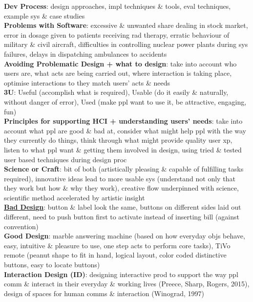 \documentclass[a4paper]{article}
\begin{document}
\begin{multicols}{3}
        \textbf{Dev Process}: design approaches, impl techniques \& tools, eval techniques, example sys \& case studies\\
        \textbf{Problems with Software}: excessive \& unwanted share dealing in stock market, error in dosage given to patients receiving rad therapy, erratic behaviour of military \& civil aircraft, difficulties in controlling nuclear power plants during sys failures, delays in dispatching ambulances to accidents\\
        \textbf{Avoiding Problematic Design + what to design}: take into account who users are, what acts are being carried out, where interaction is taking place, optimise interactions to they match users' acts \& needs\\
        \textbf{3U}: Useful (accomplish what is required), Usable (do it easily \& naturally, without danger of error), Used (make ppl want to use it, be attractive, engaging, fun)\\
        \textbf{Principles for supporting HCI + understanding users' needs}: take into account what ppl are good \& bad at, consider what might help ppl with the way they currently do things, think through what might provide quality user xp, listen to what ppl want \& getting them involved in design, using tried \& tested user based techniques during design proc\\
        \textbf{Science or Craft}: bit of both (artistically pleasing \& capable of fulfilling tasks required), innovative ideas lead to more usable sys (understand not only that they work but how \& why they work), creative flow underpinned with science, scientific method accelerated by artistic insight\\
        \underline{\textbf{Bad Design}}: button \& label look the same, buttons on different sides laid out different, need to push button first to activate instead of inserting bill (against convention)\\
        \textbf{Good Design}: marble answering machine (based on how everyday objs behave, easy, intuitive \& pleasure to use, one step acts to perform core tasks), TiVo remote (peanut shape to fit in hand, logical layout, color coded distinctive buttons, easy to locate buttons)\\
        \textbf{Interaction Design (ID)}: designing interactive prod to support the way ppl comm \& interact in their everyday \& working lives (Preece, Sharp, Rogers, 2015), design of spaces for human comms \& interaction (Winograd, 1997)\\

\end{multicols}
\end{document}
